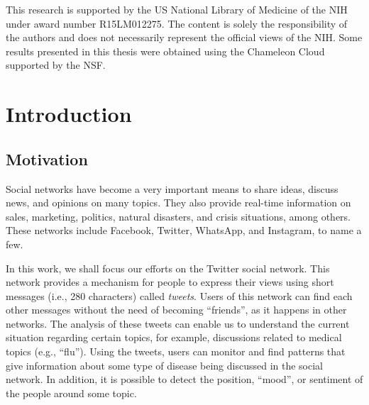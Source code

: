 \documentclass[12pt]{report}
\begin{document}
	This research is supported by the \ac{US} National Library of Medicine of the \ac{NIH} under award number R15LM012275. The content is solely the responsibility of the authors and does not necessarily represent the official views of the \ac{NIH}. Some results presented in this thesis were obtained using the Chameleon Cloud supported by the \ac{NSF}.
	\vfill
	\doublespacing
	
	\tableofcontents{}
	
	\newpage
	\printacronyms[include-classes=abbrev,name=List of Abbreviations]
	\newpage
	\listoffigures{}
	\newpage
	\listoftables{}
	
	\newpage
	
	\fancyhf{}
	\fancyhead[R]{\thepage} 
	\renewcommand{\figurename}{Fig}
	\onehalfspacing
	\chapter{Introduction}\label{Chapter 1}
	\doublespacing
	
	\section{Motivation}
	Social networks have become a very important means to share ideas, discuss news, and opinions on many topics.  They also provide real-time information on sales, marketing, politics, natural disasters, and crisis situations, among others. These networks include Facebook, Twitter, WhatsApp, and Instagram, to name a few. 
	
	In this work, we shall focus our efforts on the Twitter social network. This network provides a mechanism for people to express their views using short messages (i.e., 280 characters)
	called {\em tweets}. 
	Users of this network can find each other messages without the need of becoming ``friends'', as it happens in other networks. The analysis of these tweets can enable us to understand the current situation regarding certain topics, for example, discussions related to medical topics (e.g., ``flu'').
	Using the tweets, users can monitor and find patterns that give information about some type of disease being discussed in the social network. In addition, it is possible to detect the position,
	``mood'', or sentiment of the people around some topic.
	
\end{document}
